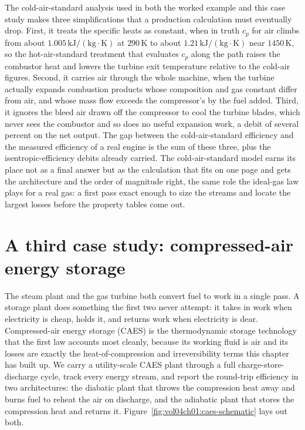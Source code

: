 \begin{mastery}
The cold-air-standard analysis used in both the worked example and this
case study makes three simplifications that a production calculation must
eventually drop. First, it treats the specific heats as constant, when in
truth $c_p$ for air climbs from about $1.005\,\text{kJ}/(\text{kg}\cdot
\si{\kelvin})$ at $290\,\si{\kelvin}$ to about $1.21\,\text{kJ}/(\text{kg}
\cdot\si{\kelvin})$ near $1450\,\si{\kelvin}$, so the hot-air-standard
treatment that evaluates $c_p$ along the path raises the combustor heat
and lowers the turbine exit temperature relative to the cold-air figures.
Second, it carries air through the whole machine, when the turbine
actually expands combustion products whose composition and gas constant
differ from air, and whose mass flow exceeds the compressor's by the fuel
added. Third, it ignores the bleed air drawn off the compressor to cool
the turbine blades, which never sees the combustor and so does no useful
expansion work, a debit of several percent on the net output. The gap
between the cold-air-standard efficiency and the measured efficiency of a
real engine is the sum of these three, plus the isentropic-efficiency
debits already carried. The cold-air-standard model earns its place not
as a final answer but as the calculation that fits on one page and gets
the architecture and the order of magnitude right, the same role the
ideal-gas law plays for a real gas: a first pass exact enough to size the
streams and locate the largest losses before the property tables come
out.
\end{mastery}

\section{A third case study: compressed-air energy storage}

The steam plant and the gas turbine both convert fuel to work in a single
pass. A storage plant does something the first two never attempt: it
takes in work when electricity is cheap, holds it, and returns work when
electricity is dear. Compressed-air energy storage (CAES) is the
thermodynamic storage technology that the first law accounts most
cleanly, because its working fluid is air and its losses are exactly the
heat-of-compression and irreversibility terms this chapter has built up.
We carry a utility-scale CAES plant through a full charge-store-discharge
cycle, track every energy stream, and report the round-trip efficiency in
two architectures: the diabatic plant that throws the compression heat
away and burns fuel to reheat the air on discharge, and the adiabatic
plant that stores the compression heat and returns it.
Figure~\ref{fig:vol04ch01:caes-schematic} lays out both.

